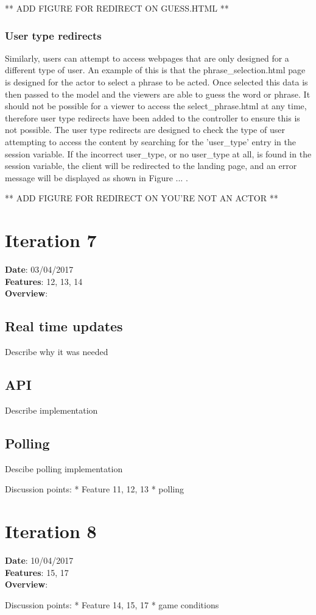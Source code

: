 ** ADD FIGURE FOR REDIRECT ON GUESS.HTML ** 

\subsubsection{User type redirects}
Similarly, users can attempt to access webpages that are only designed for a different type of user. An example of this is that the phrase\_selection.html page is designed for the actor to select a phrase to be acted. Once selected this data is then passed to the model and the viewers are able to guess the word or phrase. It should not be possible for a viewer to access the select\_phrase.html at any time, therefore user type redirects have been added to the controller to ensure this is not possible. The user type redirects are designed to check the type of user attempting to access the content by searching for the 'user\_type' entry in the session variable. If the incorrect user\_type, or no user\_type at all, is found in the session variable, the client will be redirected to the landing page, and an error message will be displayed as shown in Figure ... .

** ADD FIGURE FOR REDIRECT ON YOU'RE NOT AN ACTOR **
\newpage

\section{Iteration 7}
\textbf{Date}: 03/04/2017 \\
\textbf{Features}: 12, 13, 14 \\
\textbf{Overview}:

\subsection{Real time updates}
Describe why it was needed

\subsection{API}
Describe implementation

\subsection{Polling}
Descibe polling implementation

Discussion points:
* Feature 11, 12, 13
* polling

\newpage

\section{Iteration 8}
\textbf{Date}: 10/04/2017 \\
\textbf{Features}: 15, 17 \\
\textbf{Overview}:

Discussion points:
* Feature 14, 15, 17
* game conditions